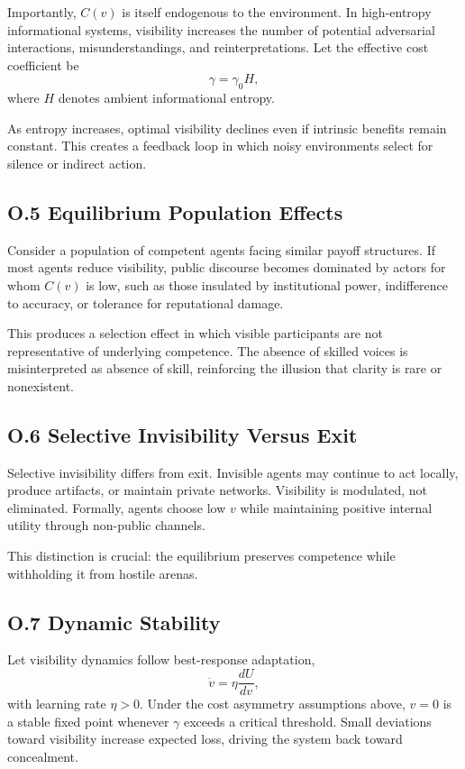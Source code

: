\documentclass[11pt]{article}
\begin{document}
Importantly, \(C(v)\) is itself endogenous to the environment. In high-entropy informational systems, visibility increases the number of potential adversarial interactions, misunderstandings, and reinterpretations. Let the effective cost coefficient be
\[
\gamma = \gamma_0 H,
\]
where \(H\) denotes ambient informational entropy.

As entropy increases, optimal visibility declines even if intrinsic benefits remain constant. This creates a feedback loop in which noisy environments select for silence or indirect action.

\subsection{O.5 Equilibrium Population Effects}

Consider a population of competent agents facing similar payoff structures. If most agents reduce visibility, public discourse becomes dominated by actors for whom \(C(v)\) is low, such as those insulated by institutional power, indifference to accuracy, or tolerance for reputational damage.

This produces a selection effect in which visible participants are not representative of underlying competence. The absence of skilled voices is misinterpreted as absence of skill, reinforcing the illusion that clarity is rare or nonexistent.

\subsection{O.6 Selective Invisibility Versus Exit}

Selective invisibility differs from exit. Invisible agents may continue to act locally, produce artifacts, or maintain private networks. Visibility is modulated, not eliminated. Formally, agents choose low \(v\) while maintaining positive internal utility through non-public channels.

This distinction is crucial: the equilibrium preserves competence while withholding it from hostile arenas.

\subsection{O.7 Dynamic Stability}

Let visibility dynamics follow best-response adaptation,
\[
\dot{v} = \eta \frac{dU}{dv},
\]
with learning rate \(\eta > 0\). Under the cost asymmetry assumptions above, \(v=0\) is a stable fixed point whenever \(\gamma\) exceeds a critical threshold. Small deviations toward visibility increase expected loss, driving the system back toward concealment.
\end{document}
